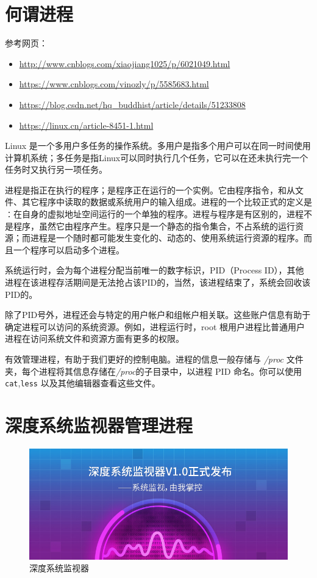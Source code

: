 \documentclass[doctor,openright,twoside]{sjtuthesis}
\providecommand{\tightlist}{%
    \setlength{\itemsep}{0pt}\setlength{\parskip}{0pt}}
\newcommand{\passthrough}[1]{#1}
\theoremstyle{plain}
\theoremstyle{definition}
\theoremstyle{remark}
\theoremstyle{ocrenumbox}
\theoremstyle{plain}
\begin{document}
\hypertarget{section-93}{%
\section{何谓进程}\label{section-93}}

参考网页：

\begin{itemize}
\tightlist
\item
  \url{http://www.cnblogs.com/xiaojiang1025/p/6021049.html}
\item
  \url{https://www.cnblogs.com/vinozly/p/5585683.html}
\item
  \url{https://blog.csdn.net/hq_buddhist/article/details/51233808}
\item
  \url{https://linux.cn/article-8451-1.html}
\end{itemize}

Linux 是一个多用户多任务的操作系统。多用户是指多个用户可以在同一时间使用计算机系统；多任务是指Linux可以同时执行几个任务，它可以在还未执行完一个任务时又执行另一项任务。

进程是指正在执行的程序；是程序正在运行的一个实例。它由程序指令，和从文件、其它程序中读取的数据或系统用户的输入组成。进程的一个比较正式的定义是∶在自身的虚拟地址空间运行的一个单独的程序。进程与程序是有区别的，进程不是程序，虽然它由程序产生。程序只是一个静态的指令集合，不占系统的运行资源；而进程是一个随时都可能发生变化的、动态的、使用系统运行资源的程序。而且一个程序可以启动多个进程。

系统运行时，会为每个进程分配当前唯一的数字标识，PID（Process ID），其他进程在该进程存活期间是无法抢占该PID的，当然，该进程结束了，系统会回收该PID的。

除了PID号外，进程还会与特定的用户帐户和组帐户相关联。这些账户信息有助于确定进程可以访问的系统资源。例如，进程运行时，root 根用户进程比普通用户进程在访问系统文件和资源方面有更多的权限。

有效管理进程，有助于我们更好的控制电脑。进程的信息一般存储与 \emph{/proc} 文件夹，每个进程将其信息存储在\emph{/proc}的子目录中，以进程 PID 命名。你可以使用 \passthrough{\lstinline!cat!},\passthrough{\lstinline!less!} 以及其他编辑器查看这些文件。

\hypertarget{section-94}{%
\section{深度系统监视器管理进程}\label{section-94}}

\begin{figure}
\centering
\includegraphics{images/deepin-system-monitor-1.jpg}
\caption{深度系统监视器}
\end{figure}
\end{document}

